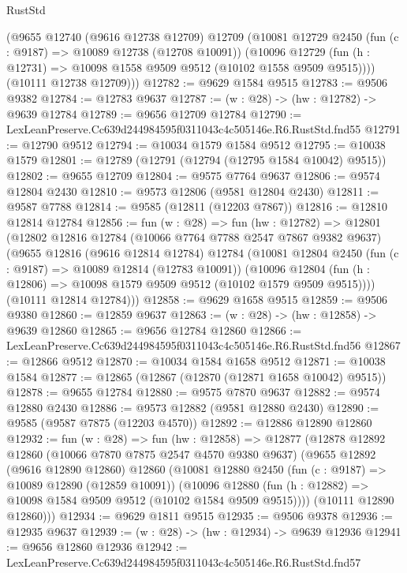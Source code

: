 \begin{lexlean}{RustStd}
\begin{coremodule}
      (@9655
        @12740
        (@9616 @12738 @12709)
        @12709
        (@10081
          @12729
          @2450
          (fun (c : @9187) => @10089 @12738 (@12708 @10091))
          (@10096 @12729 (fun (h : @12731) => @10098 @1558 @9509 @9512 (@10102 @1558 @9509 @9515))))
        (@10111 @12738 @12709)))
@12782 := @9629 @1584 @9515
@12783 := @9506 @9382
@12784 := @12783 @9637
@12787 := (w : @28) -> (hw : @12782) -> @9639 @12784
@12789 := @9656 @12709 @12784
@12790 := LexLeanPreserve.Cc639d244984595f0311043c4c505146e.R6.RustStd.fnd55
@12791 := @12790 @9512
@12794 := @10034 @1579 @1584 @9512
@12795 := @10038 @1579
@12801 := @12789 (@12791 (@12794 (@12795 @1584 @10042) @9515))
@12802 := @9655 @12709
@12804 := @9575 @7764 @9637
@12806 := @9574 @12804 @2430
@12810 := @9573 @12806 (@9581 @12804 @2430)
@12811 := @9587 @7788
@12814 := @9585 (@12811 (@12203 @7867))
@12816 := @12810 @12814 @12784
@12856 := fun (w : @28) =>
  fun (hw : @12782) =>
  @12801
    (@12802
      @12816
      @12784
      (@10066 @7764 @7788 @2547 @7867 @9382 @9637)
      (@9655
        @12816
        (@9616 @12814 @12784)
        @12784
        (@10081
          @12804
          @2450
          (fun (c : @9187) => @10089 @12814 (@12783 @10091))
          (@10096 @12804 (fun (h : @12806) => @10098 @1579 @9509 @9512 (@10102 @1579 @9509 @9515))))
        (@10111 @12814 @12784)))
@12858 := @9629 @1658 @9515
@12859 := @9506 @9380
@12860 := @12859 @9637
@12863 := (w : @28) -> (hw : @12858) -> @9639 @12860
@12865 := @9656 @12784 @12860
@12866 := LexLeanPreserve.Cc639d244984595f0311043c4c505146e.R6.RustStd.fnd56
@12867 := @12866 @9512
@12870 := @10034 @1584 @1658 @9512
@12871 := @10038 @1584
@12877 := @12865 (@12867 (@12870 (@12871 @1658 @10042) @9515))
@12878 := @9655 @12784
@12880 := @9575 @7870 @9637
@12882 := @9574 @12880 @2430
@12886 := @9573 @12882 (@9581 @12880 @2430)
@12890 := @9585 (@9587 @7875 (@12203 @4570))
@12892 := @12886 @12890 @12860
@12932 := fun (w : @28) =>
  fun (hw : @12858) =>
  @12877
    (@12878
      @12892
      @12860
      (@10066 @7870 @7875 @2547 @4570 @9380 @9637)
      (@9655
        @12892
        (@9616 @12890 @12860)
        @12860
        (@10081
          @12880
          @2450
          (fun (c : @9187) => @10089 @12890 (@12859 @10091))
          (@10096 @12880 (fun (h : @12882) => @10098 @1584 @9509 @9512 (@10102 @1584 @9509 @9515))))
        (@10111 @12890 @12860)))
@12934 := @9629 @1811 @9515
@12935 := @9506 @9378
@12936 := @12935 @9637
@12939 := (w : @28) -> (hw : @12934) -> @9639 @12936
@12941 := @9656 @12860 @12936
@12942 := LexLeanPreserve.Cc639d244984595f0311043c4c505146e.R6.RustStd.fnd57

\end{coremodule}
\end{lexlean}

